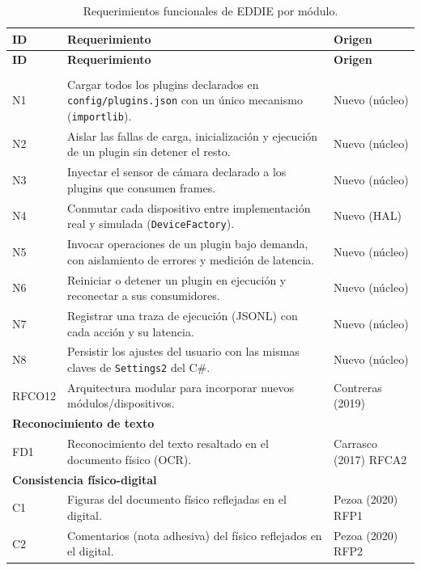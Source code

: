 \begin{longtable}{p{2.1cm} p{8.6cm} p{3.6cm}}
\caption{Requerimientos funcionales de EDDIE por módulo.}\label{tab:rf}\\
\toprule \textbf{ID} & \textbf{Requerimiento} & \textbf{Origen} \\ \midrule \endfirsthead
\toprule \textbf{ID} & \textbf{Requerimiento} & \textbf{Origen} \\ \midrule \endhead
\bottomrule \endfoot
\multicolumn{3}{l}{\textbf{Núcleo y orquestador}} \\
N1 & Cargar todos los plugins declarados en \texttt{config/plugins.json} con un único mecanismo (\texttt{importlib}). & Nuevo (núcleo) \\
N2 & Aislar las fallas de carga, inicialización y ejecución de un plugin sin detener el resto. & Nuevo (núcleo) \\
N3 & Inyectar el sensor de cámara declarado a los plugins que consumen frames. & Nuevo (núcleo) \\
N4 & Conmutar cada dispositivo entre implementación real y simulada (\texttt{DeviceFactory}). & Nuevo (HAL) \\
N5 & Invocar operaciones de un plugin bajo demanda, con aislamiento de errores y medición de latencia. & Nuevo (núcleo) \\
N6 & Reiniciar o detener un plugin en ejecución y reconectar a sus consumidores. & Nuevo (núcleo) \\
N7 & Registrar una traza de ejecución (JSONL) con cada acción y su latencia. & Nuevo (núcleo) \\
N8 & Persistir los ajustes del usuario con las mismas claves de \texttt{Settings2} del C\#. & Nuevo (núcleo) \\
RFCO12 & Arquitectura modular para incorporar nuevos módulos/dispositivos. & Contreras (2019) \\
\midrule
\multicolumn{3}{l}{\textbf{Reconocimiento de texto}} \\
FD1 & Reconocimiento del texto resaltado en el documento físico (OCR). & Carrasco (2017) RFCA2 \\
\midrule
\multicolumn{3}{l}{\textbf{Consistencia físico-digital}} \\
C1 & Figuras del documento físico reflejadas en el digital. & Pezoa (2020) RFP1 \\
C2 & Comentarios (nota adhesiva) del físico reflejados en el digital. & Pezoa (2020) RFP2 \\

\end{longtable}
